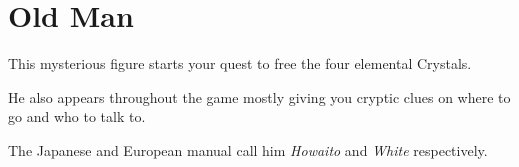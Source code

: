 \section{Old Man}
\label{char:old_man}


This mysterious figure starts your quest to free the four elemental Crystals.

He also appears throughout the game mostly giving you cryptic clues on where to go and who to talk to.

\bigskip

The Japanese and European manual call him \textit{Howaito} and \textit{White} respectively.
